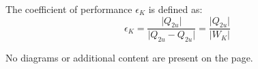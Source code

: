 The coefficient of performance \( \epsilon_K \) is defined as:  
\[
\epsilon_K = \frac{\lvert Q_{2u} \rvert}{\lvert Q_{2u} - Q_{2u} \rvert} = \frac{\lvert Q_{2u} \rvert}{\lvert W_{K} \rvert}
\]  

No diagrams or additional content are present on the page.